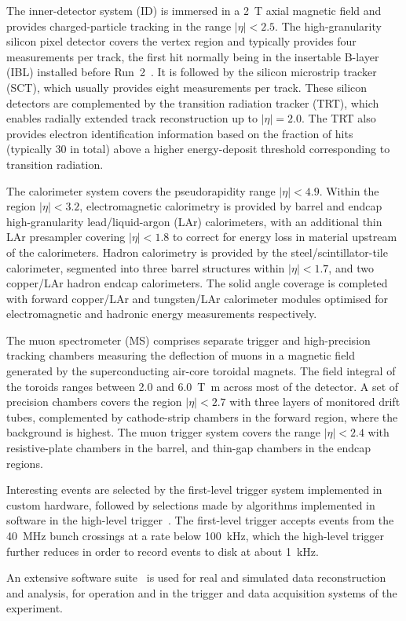 The inner-detector system (ID) is immersed in a \SI{2}{\tesla} axial magnetic field 
and provides charged-particle tracking in the range \(|\eta| < 2.5\).
The high-granularity silicon pixel detector covers the vertex region and typically provides four measurements per track, 
the first hit normally being in the insertable B-layer (IBL) installed before Run~2~\cite{ATLAS-TDR-19,PIX-2018-001}.
It is followed by the silicon microstrip tracker (SCT), which usually provides eight measurements per track.
These silicon detectors are complemented by the transition radiation tracker (TRT),
which enables radially extended track reconstruction up to \(|\eta| = 2.0\). 
The TRT also provides electron identification information 
based on the fraction of hits (typically 30 in total) above a higher energy-deposit threshold corresponding to transition radiation.

The calorimeter system covers the pseudorapidity range \(|\eta| < 4.9\).
Within the region \(|\eta|< 3.2\), electromagnetic calorimetry is provided by barrel and 
endcap high-granularity lead/liquid-argon (LAr) calorimeters,
with an additional thin LAr presampler covering \(|\eta| < 1.8\)
to correct for energy loss in material upstream of the calorimeters.
Hadron calorimetry is provided by the steel/scintillator-tile calorimeter,
segmented into three barrel structures within \(|\eta| < 1.7\), and two copper/LAr hadron endcap calorimeters.
The solid angle coverage is completed with forward copper/LAr and tungsten/LAr calorimeter modules
optimised for electromagnetic and hadronic energy measurements respectively.

The muon spectrometer (MS) comprises separate trigger and
high-precision tracking chambers measuring the deflection of muons in a magnetic field generated by the superconducting air-core toroidal magnets.
The field integral of the toroids ranges between \num{2.0} and \SI{6.0}{\tesla\metre}
across most of the detector. 
A set of precision chambers covers the region \(|\eta| < 2.7\) with three layers of monitored drift tubes,
complemented by cathode-strip chambers in the forward region, where the background is highest.
The muon trigger system covers the range \(|\eta| < 2.4\) with resistive-plate chambers in the barrel, and thin-gap chambers in the endcap regions.

Interesting events are selected by the first-level trigger system implemented in custom hardware,
followed by selections made by algorithms implemented in software in the high-level trigger~\cite{TRIG-2016-01}. 
The first-level trigger accepts events from the \SI{40}{\MHz} bunch crossings at a rate below \SI{100}{\kHz},
which the high-level trigger further reduces in order to record events to disk at about \SI{1}{\kHz}.

An extensive software suite~\cite{ATL-SOFT-PUB-2021-001} is used for real and simulated data reconstruction
and analysis, for operation and in the trigger and data acquisition systems of the experiment.
